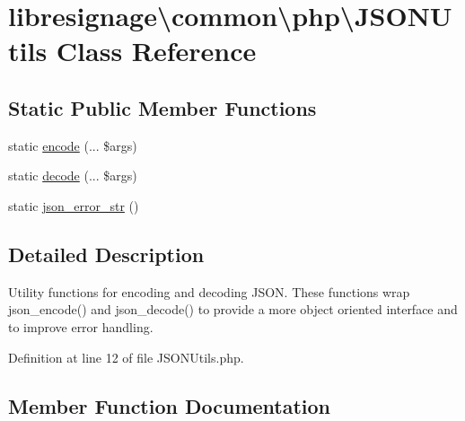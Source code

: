 \hypertarget{classlibresignage_1_1common_1_1php_1_1JSONUtils}{}\section{libresignage\textbackslash{}common\textbackslash{}php\textbackslash{}J\+S\+O\+N\+Utils Class Reference}
\label{classlibresignage_1_1common_1_1php_1_1JSONUtils}
\subsection*{Static Public Member Functions}
\begin{DoxyCompactItemize}
\item 
static \hyperlink{classlibresignage_1_1common_1_1php_1_1JSONUtils_afba0c427cdb9c845a0090fe345e389b3}{encode} (... \$args)
\item 
static \hyperlink{classlibresignage_1_1common_1_1php_1_1JSONUtils_a73a322b0d95e27f7d4369fa29a7234f2}{decode} (... \$args)
\item 
static \hyperlink{classlibresignage_1_1common_1_1php_1_1JSONUtils_a6f48ed7ad6f9656ced866a79f9e63aef}{json\+\_\+error\+\_\+str} ()
\end{DoxyCompactItemize}


\subsection{Detailed Description}
Utility functions for encoding and decoding J\+S\+ON. These functions wrap json\+\_\+encode() and json\+\_\+decode() to provide a more object oriented interface and to improve error handling. 

Definition at line 12 of file J\+S\+O\+N\+Utils.\+php.



\subsection{Member Function Documentation}
\mbox{\label{classlibresignage_1_1common_1_1php_1_1JSONUtils_a73a322b0d95e27f7d4369fa29a7234f2}} 
